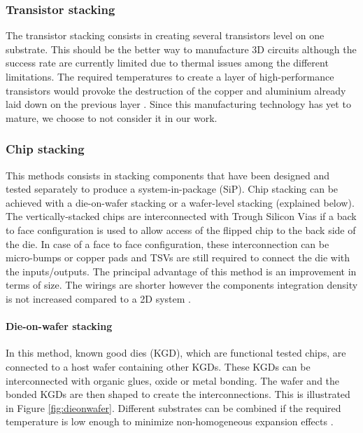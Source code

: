 \subsubsection{Transistor stacking}

The transistor stacking consists in creating several transistors level on one substrate. This should be the better way to manufacture 3D circuits although the success rate are currently limited due to thermal issues among the different limitations. The required temperatures to create a layer of high-performance transistors would provoke the destruction of the copper and aluminium already laid down on the previous layer \cite{659500}. Since this manufacturing technology has yet to mature, we choose to not consider it in our work.

\subsubsection{Chip stacking}

This methods consists in stacking components that have been designed and tested separately to produce a system-in-package (SiP). Chip stacking can be achieved with a die-on-wafer stacking or a wafer-level stacking (explained below). The vertically-stacked chips are interconnected with Trough Silicon Vias if a back to face configuration is used to allow access of the flipped chip to the back side of the die. In case of a face to face configuration, these interconnection can be micro-bumps or copper pads and TSVs are still required to connect the die with the inputs/outputs. The principal advantage of this method is an improvement in terms of size. The wirings are shorter however the components integration density is not increased compared to a 2D system \cite{659500}.

\paragraph{Die-on-wafer stacking}

In this method, known good dies (KGD), which are functional tested chips, are connected to a host wafer containing other KGDs. These KGDs can be interconnected with organic glues, oxide or metal bonding. The wafer and the bonded KGDs are then shaped to create the interconnections. This is illustrated in Figure \ref{fig:dieonwafer}. Different substrates can be combined if the required temperature is low enough to minimize non-homogeneous expansion effects \cite{659500}.

